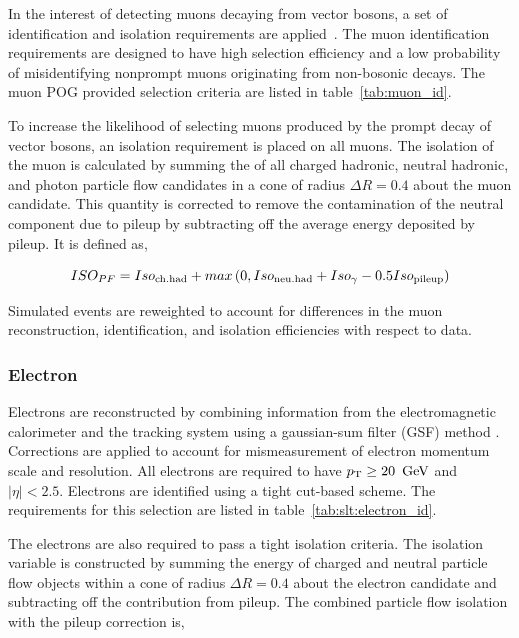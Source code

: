 In the interest of detecting muons decaying from vector bosons, a set of identification and isolation requirements are applied~\cite{Sirunyan:2018fpa}. The muon identification requirements are designed to have high selection efficiency and a low probability of misidentifying nonprompt muons originating from non-bosonic decays. The muon POG provided selection criteria are listed in table~\ref{tab:muon_id}.



\noindent To increase the likelihood of selecting muons produced by the prompt decay of vector bosons, an isolation requirement is placed on all muons. The isolation of the muon is calculated by summing the \pt of all charged hadronic, neutral hadronic, and photon particle flow candidates in a cone of radius $\Delta R = 0.4$ about the muon candidate. This quantity is corrected to remove the contamination of the neutral component due to pileup by subtracting off the average energy deposited by pileup. It is defined as,

\begin{equation}
    ISO_{PF} = Iso_{\rm ch. had} + max \left(0, Iso_{\rm neu. had} +
    Iso_{\gamma} - 0.5 Iso_{\rm pileup}\right)
\end{equation}

Simulated events are reweighted to account for differences in the muon reconstruction, identification, and isolation efficiencies with respect to data.







\subsubsection{Electron}

Electrons are reconstructed by combining information from the electromagnetic calorimeter and the tracking system using a gaussian-sum
filter (GSF) method \cite{Baffioni:2006cd}.  Corrections are applied to account for mismeasurement of electron momentum scale and resolution. All electrons are required to have $p_{\mathrm{T}} \geq 20~\,\text{Ge\hspace{-.08em}V}$ and $|\eta| < 2.5$.  Electrons are identified using a tight cut-based scheme. The requirements for this selection are listed in table~\ref{tab:slt:electron_id}.



\noindent The electrons are also required to pass a tight isolation criteria. The isolation variable is constructed by summing the energy of charged and neutral particle flow objects within a cone of radius $\Delta R = 0.4$ about the electron candidate and subtracting off the contribution from pileup.  The combined particle flow isolation with the pileup correction is,

